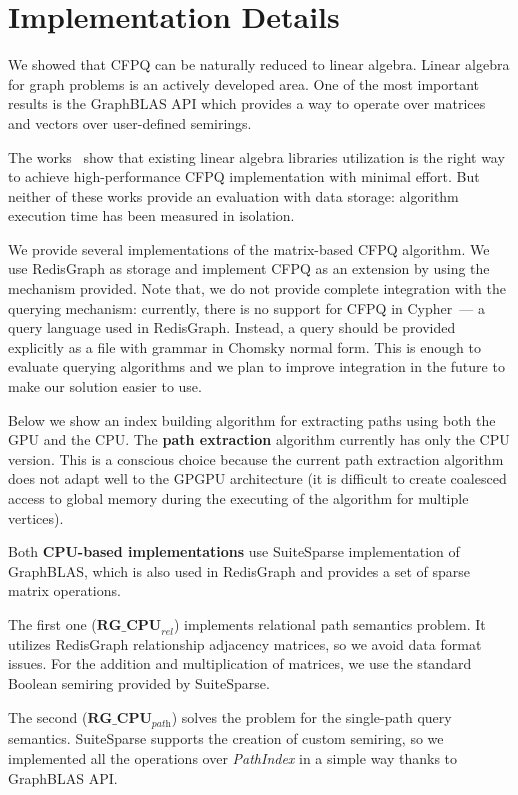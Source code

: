 \section{Implementation Details}

We showed that CFPQ can be naturally reduced to linear algebra.
Linear algebra for graph problems is an actively developed area.
One of the most important results is the GraphBLAS API which provides a way to operate over matrices and vectors over user-defined semirings.

The works~\cite{Mishin:2019:ECP:3327964.3328503, Azimov:2018:CPQ:3210259.3210264} show that existing linear algebra libraries utilization is the right way to achieve high-performance CFPQ implementation with minimal effort.
But neither of these works provide an evaluation with data storage: algorithm execution time has been measured in isolation.

We provide several implementations of the matrix-based CFPQ algorithm.
We use RedisGraph as storage and implement CFPQ as an extension by using the mechanism provided.
Note that, we do not provide complete integration with the querying mechanism: currently, there is no support for CFPQ in Cypher~--- a query language used in RedisGraph.
Instead, a query should be provided explicitly as a file with grammar in Chomsky normal form.
This is enough to evaluate querying algorithms and we plan to improve integration in the future to make our solution easier to use. 

Below we show an index building algorithm for extracting paths using both the GPU and the CPU. The \textbf{path extraction} algorithm currently has only the CPU version. This is a conscious choice because the current path extraction algorithm does not adapt well to the GPGPU architecture (it is difficult to create coalesced access to global memory during the executing of the algorithm for multiple vertices).

Both \textbf{CPU-based implementations} use SuiteSparse implementation of GraphBLAS, which is also used in RedisGraph and provides a set of sparse matrix operations.

The first one ($\textbf{RG\_CPU}_{\textit{rel}}$) implements relational path semantics problem. It utilizes RedisGraph relationship adjacency matrices, so we avoid data format issues. For the addition and multiplication of matrices, we use the standard Boolean semiring provided by SuiteSparse.

The second ($\textbf{RG\_CPU}_{\textit{path}}$) solves the problem for the single-path query semantics. SuiteSparse supports the creation of custom semiring, so we implemented all the operations over \textit{PathIndex} in a simple way thanks to GraphBLAS API.

